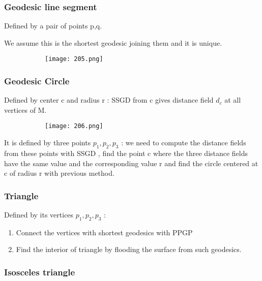 \documentclass{article}
\begin{document}
\subsubsection{Geodesic line segment}

Defined by a pair of points p,q.

We assume this is the shortest geodesic joining them and it is unique. 

\begin{figure}[ht!]
  \centering
  \begin{subfigure}[b]{0.3\linewidth}
    \texttt{[image: 205.png]}
  \end{subfigure}
\end{figure}

\subsubsection{Geodesic Circle}

Defined by center c and radius r : SSGD from c gives distance field $d_c$ at all vertices of M.

\begin{figure}[ht!]
  \centering
  \begin{subfigure}[b]{0.3\linewidth}
    \texttt{[image: 206.png]}
  \end{subfigure}
\end{figure}

It is defined by three points $p_1,p_2,p_3$  : we need to compute the distance fields from these points with SSGD , find the point c where the three distance fields have the same value and the corresponding value r and find the circle centered at c of radius r with previous method.

\subsubsection{Triangle}

Defined by its vertices $p_1,p_2,p_3$ :

\begin{enumerate}
    \item Connect the vertices with shortest geodesics with PPGP
    \item Find the interior of triangle by flooding the surface from such geodesics.
\end{enumerate}

\subsubsection{Isosceles triangle}
\end{document}
